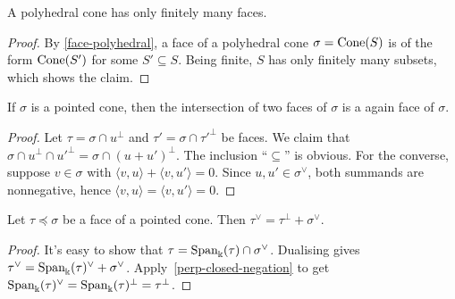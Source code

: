 \begin{lemma}
  \label{faces-polyhedral-cone-finite}
  A polyhedral cone has only finitely many faces.
\end{lemma}
\begin{proof}
  \uses{}
  By \ref{face-polyhedral}, a face of a polyhedral cone \( \sigma =
  \operatorname{Cone}(S) \) is of the form \( \operatorname{Cone}(S') \) for some \( S' \subseteq
  S \). Being finite, \( S \) has only finitely many subsets, which
  shows the claim.
\end{proof}


\begin{lemma}
  \label{face-intersection}
  \leanok
  If \( \sigma \) is a pointed cone, then the intersection of two
  faces of \( \sigma \) is a again face of \( \sigma \).
\end{lemma}
\begin{proof}
  \uses{}
  Let \( \tau = \sigma \cap u^{\perp} \) and \( \tau' = \sigma \cap
  \tau'^{\perp} \) be faces. We claim that \( \sigma \cap u^{\perp}
  \cap u'^{\perp} = \sigma \cap (u + u')^{\perp} \). The inclusion
  ``\( \subseteq \)'' is obvious. For the converse, suppose \( v \in
  \sigma \) with \( \langle v, u \rangle + \langle v, u' \rangle = 0
  \). Since \( u, u' \in \sigma^{\vee} \), both summands are
  nonnegative, hence \( \langle v, u \rangle = \langle v, u' \rangle =
  0 \).
\end{proof}

\begin{lemma}
  \label{face-dual-eq-sum}
  Let \( \tau \preceq \sigma \) be a face of a pointed cone. Then \(
  \tau^{\vee} = \tau^{\perp} + \sigma^{\vee} \).
\end{lemma}
\begin{proof}
  It's easy to show that \( \tau = \operatorname{Span}_{\Bbbk}(\tau) \cap
  \sigma^{\vee} \). Dualising gives \( \tau^{\vee} =
  \operatorname{Span}_{\Bbbk}(\tau)^{\vee} + \sigma^{\vee} \).
  Apply~\ref{perp-closed-negation} to get \(
  \operatorname{Span}_{\Bbbk}(\tau)^{\vee} = \operatorname{Span}_{\Bbbk}(\tau)^{\perp} =
  \tau^{\perp} \).
\end{proof}


